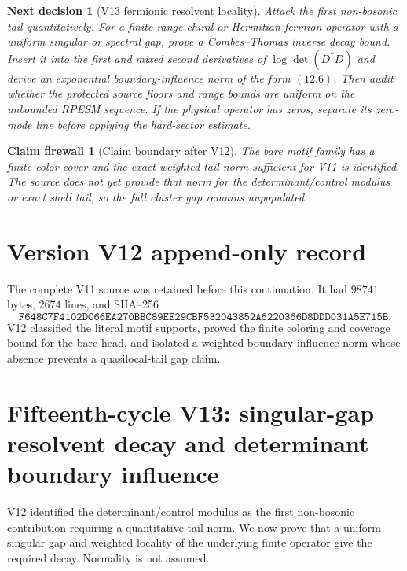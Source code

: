 \documentclass[11pt]{article}
\newtheorem{firewall}[theorem]{Claim firewall}
\newtheorem{decision}[theorem]{Next decision}
\theoremstyle{remark}
\begin{document}
\begin{decision}[V13 fermionic resolvent locality]
\label{dec:v15v12-next}
Attack the first non-bosonic tail quantitatively.  For a
finite-range chiral or Hermitian fermion operator with a uniform
singular or spectral gap, prove a Combes--Thomas inverse decay
bound.  Insert it into the first and mixed second derivatives of
\(\log\det(D^*D)\) and derive an exponential boundary-influence
norm of the form \((12.6)\).  Then audit whether the protected
source floors and range bounds are uniform on the unbounded RPESM
sequence.  If the physical operator has zeros, separate its
zero-mode line before applying the hard-sector estimate.
\end{decision}

\begin{firewall}[Claim boundary after V12]
\label{fire:v15v12}
The bare motif family has a finite-color cover and the exact
weighted tail norm sufficient for V11 is identified.  The source
does not yet provide that norm for the determinant/control modulus
or exact shell tail, so the full cluster gap remains unpopulated.
\end{firewall}

\section*{Version V12 append-only record}
The complete V11 source was retained before this continuation.  It
had \(98741\) bytes, \(2674\) lines, and SHA--256
\[
 \texttt{F648C7F4102DC66EA270BBC89EE29CBF532043852A6220366D8DDD031A5E715B}.
\]
V12 classified the literal motif supports, proved the finite
coloring and coverage bound for the bare head, and isolated a
weighted boundary-influence norm whose absence prevents a
quasilocal-tail gap claim.




\section{Fifteenth-cycle V13: singular-gap resolvent decay and determinant boundary influence}
\label{sec:v15v13}

V12 identified the determinant/control modulus as the first
non-bosonic contribution requiring a quantitative tail norm.  We
now prove that a uniform singular gap and weighted locality of the
underlying finite operator give the required decay.  Normality is
not assumed.
\end{document}
